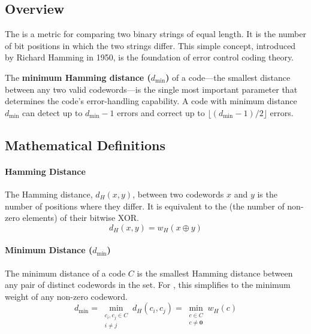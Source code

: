 \subsection{Overview}

The  is a metric for comparing two binary strings of equal length. It is the number of bit positions in which the two strings differ. This simple concept, introduced by Richard Hamming in 1950, is the foundation of error control coding theory.

\begin{keyconcept}
    The \textbf{minimum Hamming distance ($d_{\min}$)} of a code---the smallest distance between any two valid codewords---is the single most important parameter that determines the code's error-handling capability. A code with minimum distance $d_{\min}$ can detect up to $d_{\min}-1$ errors and correct up to $\lfloor(d_{\min}-1)/2\rfloor$ errors.
\end{keyconcept}


\subsection{Mathematical Definitions}

\paragraph{Hamming Distance}
The Hamming distance, $d_H(x, y)$, between two codewords $x$ and $y$ is the number of positions where they differ. It is equivalent to the  (the number of non-zero elements) of their bitwise XOR.
\begin{equation}
    d_H(x, y) = w_H(x \oplus y)
\end{equation}

\paragraph{Minimum Distance ($d_{\min}$)}
The minimum distance of a code $C$ is the smallest Hamming distance between any pair of distinct codewords in the set. For , this simplifies to the minimum weight of any non-zero codeword.
\begin{equation}
    d_{\min} = \min_{\substack{c_i, c_j \in C \\ i \neq j}} d_H(c_i, c_j) = \min_{\substack{c \in C \\ c \neq \mathbf{0}}} w_H(c)
\end{equation}

